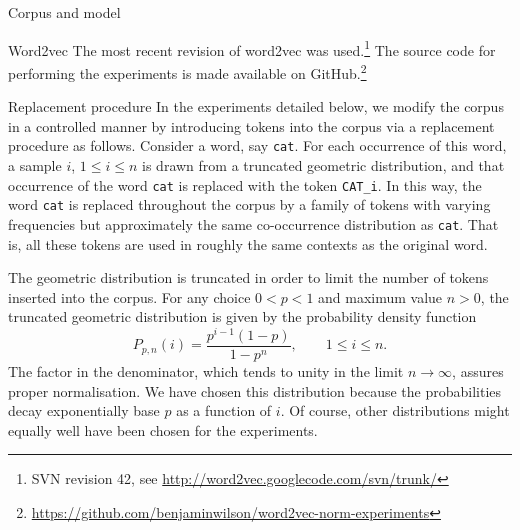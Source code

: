 \documentclass{article} %
\newcommand{\word}[1]{\texttt{#1}}
\begin{document}
\begin{section}{Corpus and model}
\begin{subsection}{Word2vec}
The most recent revision of word2vec was used.\footnote{SVN revision 42,
  see \url{http://word2vec.googlecode.com/svn/trunk/}} The source code
for performing the experiments is made available on
GitHub.\footnote{\url{https://github.com/benjaminwilson/word2vec-norm-experiments}}

\begin{table}
	
	\caption{ Number of words, by frequency band, as observed in the
          unmodified corpus.  }
	\label{word-occurrences-table}
\end{table}
\end{subsection}

\begin{subsection}{Replacement procedure}\label{replacement-procedure}
In the experiments detailed below, we modify the corpus in a controlled
manner by introducing tokens into the corpus via a replacement procedure
as follows.  Consider a word, say \word{cat}.  For each occurrence of
this word, a sample $i$, $1 \leqslant i \leqslant n$ is drawn from a
truncated geometric distribution, and that occurrence of the word
\word{cat} is replaced with the token \word{CAT\_i}.  In this way, the
word \word{cat} is replaced throughout the corpus by a family of tokens
with varying frequencies but approximately the same co-occurrence
distribution as \word{cat}.  That is, all these tokens are used in
roughly the same contexts as the original word.

The geometric distribution is truncated in order to limit the number of
tokens inserted into the corpus.  For any choice $0 < p < 1$ and
maximum value $n > 0$, the truncated geometric distribution is given by
the probability density function
\begin{equation} 
\label{distro}
P_{p, n} (i) = \frac{p^{i-1}  (1-p)}{1 - p^n}, \qquad 1
\leqslant i \leqslant n.
\end{equation} 
The factor in the denominator, which tends to unity in the limit $n \to
\infty$, assures proper normalisation.  We have chosen this distribution
because the probabilities decay exponentially base $p$ as a function of
$i$.  Of course, other distributions might equally well have been chosen
for the experiments.
\end{subsection}
\end{section}
\end{document}

